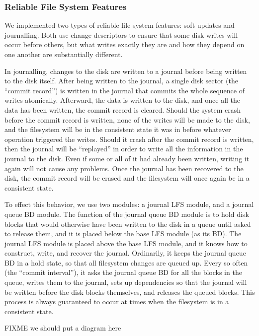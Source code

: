 \subsubsection{Reliable File System Features}
\label{sec:solution:impl:reliable}

We implemented two types of reliable file system features: soft updates and
journalling. Both use change descriptors to ensure that some disk writes will
occur before others, but what writes exactly they are and how they depend on one
another are substantially different.

In journalling, changes to the disk are written to a journal before being
written to the disk itself. After being written to the journal, a single disk
sector (the ``commit record'') is written in the journal that commits the whole
sequence of writes atomically. Afterward, the data is written to the disk, and
once all the data has been written, the commit record is cleared. Should the
system crash before the commit record is written, none of the writes will be
made to the disk, and the filesystem will be in the consistent state it was in
before whatever operation triggered the writes. Should it crash after the commit
record is written, then the journal will be ``replayed'' in order to write all
the information in the journal to the disk. Even if some or all of it had
already been written, writing it again will not cause any problems. Once the
journal has been recovered to the disk, the commit record will be erased and the
filesystem will once again be in a consistent state.

To effect this behavior, we use two modules: a journal LFS module, and a journal
queue BD module. The function of the journal queue BD module is to hold disk
blocks that would otherwise have been written to the disk in a queue until asked
to release them, and it is placed below the base LFS module (as its BD). The
journal LFS module is placed above the base LFS module, and it knows how to
construct, write, and recover the journal. Ordinarily, it keeps the journal
queue BD in a hold state, so that all filesystem changes are queued up. Every so
often (the ``commit interval''), it asks the journal queue BD for all the blocks
in the queue, writes them to the journal, sets up dependencies so that the
journal will be written before the disk blocks themselves, and releases the
queued blocks. This process is always guaranteed to occur at times when the
filesystem is in a consistent state.

FIXME we should put a diagram here


